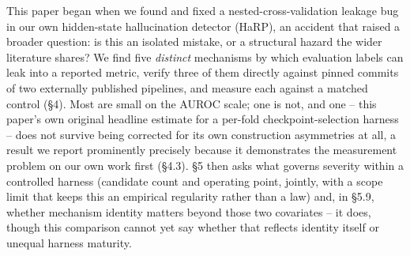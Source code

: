 \documentclass[10pt]{article} %
\begin{document}
This paper began when we found and fixed a nested-cross-validation leakage
bug in our own hidden-state hallucination detector (HaRP), an accident that
raised a broader question: is this an isolated mistake, or a structural
hazard the wider literature shares? We find five \emph{distinct} mechanisms
by which evaluation labels can leak into a reported metric, verify three of
them directly against pinned commits of two externally published
pipelines, and measure each against a matched control (§4). Most are small
on the AUROC scale; one is not, and one -- this paper's own original
headline estimate for a per-fold checkpoint-selection harness -- does not
survive being corrected for its own construction asymmetries at all, a
result we report prominently precisely because it demonstrates the
measurement problem on our own work first (§4.3). §5 then asks what governs
severity within a controlled harness (candidate count and operating point,
jointly, with a scope limit that keeps this an empirical regularity rather
than a law) and, in §5.9, whether mechanism identity matters beyond those
two covariates -- it does, though this comparison cannot yet say whether
that reflects identity itself or unequal harness maturity.
\end{document}
